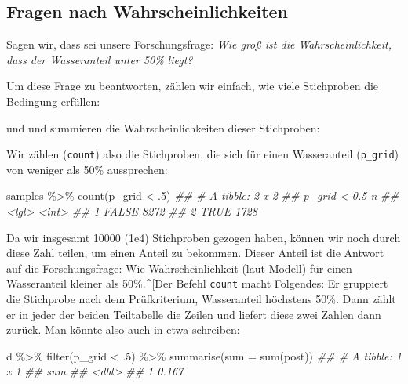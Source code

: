\documentclass[
  a4paper,
  DIV=11]{scrreprt}
\newenvironment{Shaded}{\begin{snugshade}}{\end{snugshade}}
\newcommand{\AttributeTok}[1]{\textcolor[rgb]{0.40,0.45,0.13}{#1}}
\newcommand{\DecValTok}[1]{\textcolor[rgb]{0.68,0.00,0.00}{#1}}
\newcommand{\DocumentationTok}[1]{\textcolor[rgb]{0.37,0.37,0.37}{\textit{#1}}}
\newcommand{\FunctionTok}[1]{\textcolor[rgb]{0.28,0.35,0.67}{#1}}
\newcommand{\NormalTok}[1]{\textcolor[rgb]{0.00,0.23,0.31}{#1}}
\newcommand{\SpecialCharTok}[1]{\textcolor[rgb]{0.37,0.37,0.37}{#1}}
\theoremstyle{definition}
\theoremstyle{remark}
\begin{document}
\hypertarget{fragen-nach-wahrscheinlichkeiten}{%
\subsection{Fragen nach
Wahrscheinlichkeiten}\label{fragen-nach-wahrscheinlichkeiten}}

Sagen wir, dass sei unsere Forschungsfrage: \emph{Wie groß ist die
Wahrscheinlichkeit, dass der Wasseranteil unter 50\% liegt?}

Um diese Frage zu beantworten, zählen wir einfach, wie viele Stichproben
die Bedingung erfüllen:

und und summieren die Wahrscheinlichkeiten dieser Stichproben:

Wir zählen (\texttt{count}) also die Stichproben, die sich für einen
Wasseranteil (\texttt{p\_grid}) von weniger als 50\% aussprechen:

\begin{Shaded}
\begin{Highlighting}[]
\NormalTok{samples }\SpecialCharTok{\%\textgreater{}\%}
  \FunctionTok{count}\NormalTok{(p\_grid }\SpecialCharTok{\textless{}}\NormalTok{ .}\DecValTok{5}\NormalTok{) }
\DocumentationTok{\#\# \# A tibble: 2 x 2}
\DocumentationTok{\#\#   \textasciigrave{}p\_grid \textless{} 0.5\textasciigrave{}     n}
\DocumentationTok{\#\#   \textless{}lgl\textgreater{}          \textless{}int\textgreater{}}
\DocumentationTok{\#\# 1 FALSE           8272}
\DocumentationTok{\#\# 2 TRUE            1728}
\end{Highlighting}
\end{Shaded}

Da wir insgesamt 10000 (1e4) Stichproben gezogen haben, können wir noch
durch diese Zahl teilen, um einen Anteil zu bekommen. Dieser Anteil ist
die Antwort auf die Forschungsfrage: Wie Wahrscheinlichkeit (laut
Modell) für einen Wasseranteil kleiner als 50\%.\^{}{[}Der Befehl
\texttt{count} macht Folgendes: Er gruppiert die Stichprobe nach dem
Prüfkriterium, Wasseranteil höchstens 50\%. Dann zählt er in jeder der
beiden Teiltabelle die Zeilen und liefert diese zwei Zahlen dann zurück.
Man könnte also auch in etwa schreiben:

\begin{Shaded}
\begin{Highlighting}[]
\NormalTok{d }\SpecialCharTok{\%\textgreater{}\%}
  \FunctionTok{filter}\NormalTok{(p\_grid }\SpecialCharTok{\textless{}}\NormalTok{ .}\DecValTok{5}\NormalTok{) }\SpecialCharTok{\%\textgreater{}\%}
  \FunctionTok{summarise}\NormalTok{(}\AttributeTok{sum =} \FunctionTok{sum}\NormalTok{(post))}
\DocumentationTok{\#\# \# A tibble: 1 x 1}
\DocumentationTok{\#\#     sum}
\DocumentationTok{\#\#   \textless{}dbl\textgreater{}}
\DocumentationTok{\#\# 1 0.167}
\end{Highlighting}
\end{Shaded}
\end{document}
